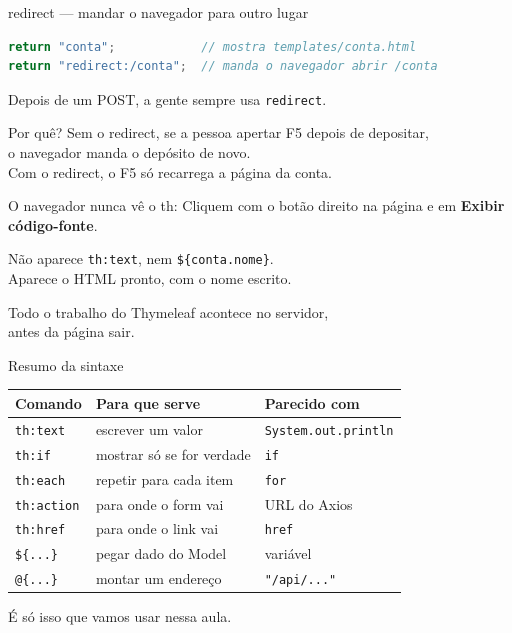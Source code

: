 \documentclass[aspectratio=169,11pt]{beamer}
\begin{document}
\begin{frame}[fragile]{redirect --- mandar o navegador para outro lugar}
\begin{lstlisting}[language=Java,basicstyle=\ttfamily\footnotesize]
return "conta";            // mostra templates/conta.html
return "redirect:/conta";  // manda o navegador abrir /conta
\end{lstlisting}

  \vspace{0.4em}
  Depois de um POST, a gente sempre usa \texttt{redirect}.

  \vspace{0.4em}
  \begin{block}{Por quê?}
    Sem o redirect, se a pessoa apertar F5 depois de depositar,\\
    o navegador manda o depósito de novo.\\
    Com o redirect, o F5 só recarrega a página da conta.
  \end{block}
\end{frame}

\begin{frame}{O navegador nunca vê o th:}
  Cliquem com o botão direito na página e em \textbf{Exibir código-fonte}.

  \vspace{0.6em}
  Não aparece \texttt{th:text}, nem \texttt{\$\{conta.nome\}}.\\
  Aparece o HTML pronto, com o nome escrito.

  \vspace{0.6em}
  Todo o trabalho do Thymeleaf acontece no servidor,\\
  antes da página sair.
\end{frame}

\begin{frame}{Resumo da sintaxe}
  \begin{center}
  \begin{tabular}{lll}
    \toprule
    Comando & Para que serve & Parecido com \\
    \midrule
    \texttt{th:text} & escrever um valor & \texttt{System.out.println} \\
    \texttt{th:if} & mostrar só se for verdade & \texttt{if} \\
    \texttt{th:each} & repetir para cada item & \texttt{for} \\
    \texttt{th:action} & para onde o form vai & URL do Axios \\
    \texttt{th:href} & para onde o link vai & \texttt{href} \\
    \texttt{\$\{...\}} & pegar dado do Model & variável \\
    \texttt{@\{...\}} & montar um endereço & \texttt{"/api/..."} \\
    \bottomrule
  \end{tabular}
  \end{center}

  \vspace{0.5em}
  É só isso que vamos usar nessa aula.
\end{frame}
\end{document}

